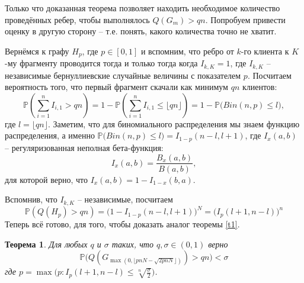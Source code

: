 \documentclass{matmex-diploma-custom}
\newcommand{\PRob}{\mathbb P}
\newcommand{\leqs}{\leqslant}
\newtheorem{theorem}{Теорема}
\theoremstyle{named}
\begin{document}
\bigskip

Только что доказанная теорема позволяет находить необходимое количество проведённых ребер, чтобы выполнялось $Q(G_m) > qn$.
Попробуем привести оценку в другую сторону -- т.е. понять, какого количества точно не хватит.

Вернёмся к графу $H_p$, где $p \in [0,1]$ и вспомним, что ребро от $k$-го клиента к $K$-му фрагменту проводится тогда и только тогда
когда $I_{k,K} = 1$, где $I_{k,K}$ -- независимые бернуллиевские случайные величины с показателем $p$. 
Посчитаем вероятность того, что первый фрагмент скачали как минимум $qn$ клиентов:
\begin{equation}
\PRob\left(\sum_{i=1}^n I_{i,1} > qn\right) 
	= 
1 - \PRob\left(\sum_{i=1}^n I_{i,1} \leqs \lfloor qn \rfloor\right) 
	= 
1 - \PRob\big(Bin(n, p) \leqs l\big),
\end{equation}
где $l = \lfloor qn \rfloor$. Заметим, что для биномиального распределения мы знаем функцию распределения, 
а именно $\PRob\big(Bin(n, p) \leqs l\big) = I_{1-p}(n-l, l+1)$, где $I_x(a,b)$ -- регуляризованная неполная бета-функция:
\begin{equation}
I_x(a,b) = \frac{B_x(a,b)}{B(a,b)},
\end{equation}
для которой верно, что $I_x(a,b) = 1 - I_{1-x}(b, a)$.

Вспомнив, что $I_{k,K}$ -- независимые, посчитаем
\begin{equation}\label{n21}
\PRob(Q(H_p) > qn) = \big(1 - I_{1-p}(n-l, l+1)\big)^N = \big(I_{p}(l+1, n-l)\big)^n
\end{equation}
Теперь всё готово, для того, чтобы доказать аналог теоремы \ref{t1}.

\begin{theorem}\label{t2}
Для любых $q$ и $\sigma$ таких, что $q, \sigma \in (0,1)$ верно
\begin{equation}
\PRob\big(Q(G_{\max(0, \lfloor pnN - \sqrt{2pnN} \rfloor)}) > qn\big) < \sigma
\end{equation}
где $p = \max\big(p :  I_p(l+1, n-l) \leqs \sqrt[n]{\frac\sigma{2}} \big)$.
\end{theorem}
\end{document}
